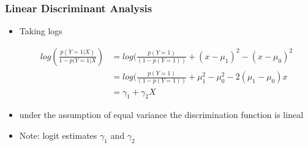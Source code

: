 \documentclass[
  shownotes,
  xcolor={svgnames},
  hyperref={colorlinks,citecolor=DarkBlue,linkcolor=DarkRed,urlcolor=DarkBlue}
  , aspectratio=169]{beamer}
\begin{document}
\begin{frame}[fragile]
\frametitle{Linear Discriminant Analysis}
\begin{itemize}
  \item Taking logs

\begin{align}
  log \left( \frac{p (Y=1|X)}{1-p (Y=1|X}\right)  &= log(\frac{p(Y=1)}{(1-p(Y=1))}+(x-\mu_1)^2-(x-\mu_0)^2 \\
  &= log(\frac{p(Y=1)}{(1-p(Y=1))}+\mu^2_1-\mu^2_0-2(\mu_1-\mu_0)x \\
  &= \gamma_1 +\gamma_2 X
  \end{align}  
  \item under the assumption of equal variance the discrimination function is lineal
  \item Note: logit estimates $\gamma_1$ and $\gamma_2$
\end{itemize}

\end{frame}
\end{document}
